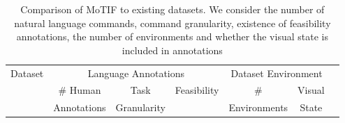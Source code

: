 \begin{table}[t]
  \renewcommand\arraystretch{0.95}
    \centering
        \caption{Comparison of MoTIF to existing datasets. We consider the number of natural language commands, command granularity, existence of feasibility annotations, the number of environments and whether the visual state is included in annotations}
    \begin{tabular}{|l|c|c|c|c|c|c|}
    \hline
       \multirow{3}{*}{Dataset} & \multicolumn{3}{c|}{Language Annotations} & \multicolumn{2}{c|}{Dataset Environment} \\ 
    \cline{2-6}
         & \# Human & Task & \multirow{2}{*}{Feasibility} & \# & Visual \\ %
                  & Annotations & Granularity & & Environments & State \\ %
                                              \hline


\end{tabular}
\end{table}
